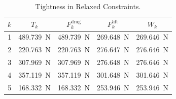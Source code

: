 \documentclass[12pt,reqno]{article}
\theoremstyle{definition}
\numberwithin{equation}{section}
\begin{document}
    \begin{table}[htbp]
        \centering
        \begin{center}
        \begin{tabular}{ccccc}
            \toprule
            $k$ & $T_k$ & $F_k^\text{drag}$ & $F_k^\text{lift}$ & $W_k$ \\
            \midrule
            1 & \SI{489.739}{\newton} & \SI{489.739}{\newton} & \SI{269.648}{\newton} & \SI{269.646}{\newton} \\
            2 & \SI{220.763}{\newton} & \SI{220.763}{\newton} & \SI{276.647}{\newton} & \SI{276.646}{\newton} \\
            3 & \SI{307.969}{\newton} & \SI{307.969}{\newton} & \SI{276.648}{\newton} & \SI{276.646}{\newton} \\
            4 & \SI{357.119}{\newton} & \SI{357.119}{\newton} & \SI{301.648}{\newton} & \SI{301.646}{\newton} \\
            5 & \SI{168.332}{\newton} & \SI{168.332}{\newton} & \SI{253.946}{\newton} & \SI{253.946}{\newton} \\
            \bottomrule
        \end{tabular}
        \end{center}
        \caption{Tightness in Relaxed Constraints.}
        \label{tab:uav_tight_comparison}
    \end{table}
\end{document}
